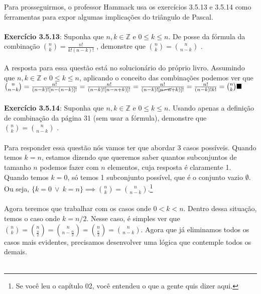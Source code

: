 \documentclass[a4paper,11pt,oneside]{book}
\theoremstyle{definition}
\theoremstyle{break}
\begin{document}
Para prosseguirmos, o professor Hammack usa os exercícios 3.5.13 e 3.5.14 como ferramentas para expor algumas implicações do triângulo de Pascal.
\\
\\
\textbf{Exercício 3.5.13}: Suponha que $n,k \in \mathbb{Z}$ e $0 \leq k \leq n$. De posse da fórmula da combinação \tiny ${n \choose k} = \frac{n!}{k!(n-k)!}$ \normalsize , demonstre que \tiny $ {n \choose k} = {n \choose {n-k}} $ \normalsize.
\\
\\
A resposta para essa questão está no solucionário do próprio livro. Assumindo que $ n,k \in \mathbb{Z} $ e $ 0 \leq k \leq n $, aplicando o conceito das combinações podemos ver que \tiny $ {n \choose n - k} = \frac{n!}{(n-k)![n-(n-k)]!} = \frac{n!}{(n-k)![n-n+k)]!} = \frac{n!}{(n-k)![\cancel{n-n}+k)]!} = \frac{n!}{(n-k)!k!} = {n \choose k} \blacksquare$ \normalsize
\\
\\
\textbf{Exercício 3.5.14}: Suponha que $n,k \in \mathbb{Z}$ e $0 \leq k \leq n$. Usando apenas a definição de combinação da página 31 (sem usar a fórmula), demonstre que \tiny $ {n \choose k} = {n \choose {n-k}} $ \normalsize.  
\\
\\
Para responder essa questão nós vamos ter que abordar 3 casos possíveis. Quando temos $ k = n $, estamos dizendo que queremos saber quantos subconjuntos de tamanho $n$ podemos fazer com $n$ elementos, cuja resposta é claramente 1. Quando temos $ k = 0 $, só temos 1 subconjunto possível, que é o conjunto vazio $\emptyset$. Ou seja, $\{k = 0 \ \lor \  k = n\} \implies {n \choose k} = {n \choose n - k}$.\footnote{Se você leu o capítulo 02, você entendeu o que a gente quis dizer aqui.}
\\
\\
Agora teremos que trabalhar com os casos onde $0 < k < n$. Dentro dessa situação, temos o caso onde $k = n/2$. Nesse caso, é simples ver que ${n \choose k} = {n \choose \frac{n}{2}} = {n \choose n - \frac{n}{2}} = {n \choose \frac{n}{2}} = {n \choose n - k}$. Agora que já eliminamos todos os casos mais evidentes, precisamos desenvolver uma lógica que contemple todos os demais.
\\
\\
\end{document}
